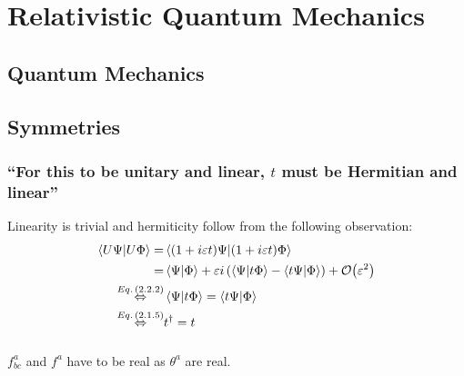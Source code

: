 \section{Relativistic Quantum Mechanics}\label{sec:chapter2}

\subsection{Quantum Mechanics}\label{susec:2_1}

\subsection{Symmetries}\label{susec:2_2}
\subsubsection{\enquote{For this to be unitary and linear, $t$ must be Hermitian and linear} }\label{sususec:2_2_p51_1}
Linearity is trivial and hermiticity follow from the following observation:
\begin{align*} 
	\braket{U\Psi}{U\Phi}=&\braket{(1+i\varepsilon t) \Psi}{(1+i\varepsilon t) \Phi}\\
	=&\braket{\Psi}{\Phi}+\varepsilon i\left(\braket{\Psi}{t \Phi}-\braket{t\Psi}{ \Phi}\right)+\order{\varepsilon^2}\\
	\overset{\eq{2.2.2}}{\Leftrightarrow}&\braket{\Psi}{t \Phi}=\braket{t\Psi}{\Phi}\\
	\overset{\eq{2.1.5}}{\Leftrightarrow}&t^\dagger=t
\end{align*}

\subsubsection{ }
$f^a_{bc}$ and $f^a$ have to be real as $\theta^a$ are real.

